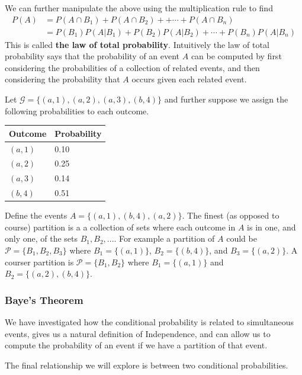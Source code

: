 We can further manipulate the above using the multiplication rule to find
\begin{align}
    P(A) &= P\left(A \cap B_{1}\right) +  P\left(A \cap B_{2}\right) +     + \cdots  +  P\left(A \cap B_{n}\right)  \\ 
         &= P(B_{1}) P(A|B_{1}) + P(B_{2}) P(A|B_{2}) + \cdots + P(B_{n}) P(A|B_{n}) 
\end{align}
This is called \textbf{the law of total probability}.
Intuitively the law of total probability says that the probability of an event $A$ can be computed by first considering the probabilities of a collection of related events, and then considering the probability that $A$ occurs given each related event. 

\ex Let $\mathcal{G} = \{(a,1), (a,2), (a,3), (b,4)\}$ and further suppose we assign the following probabilities to each outcome. 
\begin{table}[ht!]
    \centering
    \begin{tabular}{ll}
        Outcome & Probability \\
        \hline
        $(a,1)$ & 0.10\\
        $(a,2)$ & 0.25\\
        $(a,3)$ & 0.14\\
        $(b,4)$ & 0.51
    \end{tabular}
\end{table}

Define the events $A = \{ (a,1), (b,4), (a,2) \}$. The finest (as opposed to course) partition is a a collection of sets where each outcome in $A$ is in one, and only one, of the sets $B_{1},B_{2},...$. For example a partition of $A$ could be $\mathcal{P} = \{ B_{1}, B_{2}, B_{3} \}$ where $B_{1} = \{(a,1)\}$, $B_{2} = \{(b,4)\}$, and $B_{3} = \{(a,2)\}$. 
A courser partition is $\mathcal{P} = \{ B_{1}, B_{2} \}$ where $B_{1} = \{(a,1)\}$ and $B_{2} = \{(a,2),(b,4)\}$.



\subsubsection{Baye's Theorem}

We have investigated how the conditional probability is related to simultaneous events, gives us a natural definition of Independence, and can allow us to compute the probability of an event if we have a partition of that event. 

The final relationship we will explore is between two conditional probabilities. 

